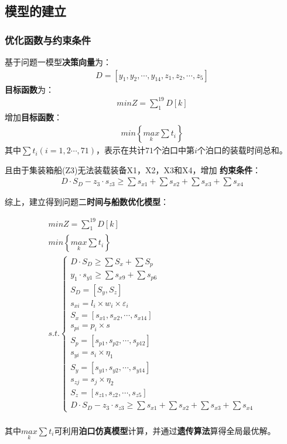 \documentclass{whutmod}
\begin{document}
	\subsection{模型的建立}
	    \subsubsection{优化函数与约束条件}
	基于问题一模型\textbf{决策向量}为：
	\begin{gather*}
	D=[y_{1},y_{2},\cdots,y_{14},z_{1},z_{2},\cdots,z_{5}]
	\end{gather*}
	\textbf{目标函数}为：
	\begin{gather}
	min Z=\sum _{1}^{19}D[k]
	\end{gather}
	增加\textbf{目标函数}：
		\begin{gather}
	min \left \{ \underset{k}{max}\sum t_{i} \right \}
	\end{gather}
	其中$\sum t_{i}(i=1,2\cdots,71)$，表示在共计$71$个泊口中第$i$个泊口的装载时间总和。	
	

	且由于集装箱船(Z3)无法装载装备X1，X2，X3和X4，增加	\textbf{约束条件}：
	\begin{gather}
	D \cdot S_{D} - z_{3} \cdot s_{z3} \geq  \sum s_{x1}+ \sum s_{x2}+\sum s_{x3}+ \sum s_{x4}
	\end{gather}
	
	
		综上，建立得到问题二\textbf{时间与船数优化模型}：

	\begin{gather}
min Z=\sum _{1}^{19}D[k]\\
min \left \{ \underset{k}{max}\sum t_{i} \right \}\\
s.t.\left\{\begin{matrix}	 D\cdot S_{D}\geq \sum  S_{x} + \sum  S_{p}
\\ y_{1}\cdot s_{y1}\geq \sum s_{x9}+ \sum  s_{p6}
\\S_{D}=[S_{y}, S_{z}]
\\ s_{xi}=l_{i}\times w_{i} \times \varepsilon _{i}
\\S_{x}=[s_{x1},s_{x2},\cdots,s_{x14}]
\\s_{pi}=p_{i}\times s
\\S_{p}=[s_{p1},s_{p2},\cdots,s_{p12}]
\\     s_{yi}=s_{i}\times \eta_{1}
\\   S_{y}=[s_{y1},s_{y2},\cdots,s_{y14}]
\\      s_{zj}=s_{j}\times \eta_{2}
\\ S_{z}=[s_{z1},s_{z2},\cdots,s_{z5}]
\\	D \cdot S_{D} - z_{3} \cdot s_{z3} \geq  \sum s_{x1}+ \sum s_{x2}+\sum s_{x3}+ \sum s_{x4}
\end{matrix}\right. 
\end{gather}
	     ~\\
	其中$ \underset{k}{max}\sum t_{i} $可利用\textbf{泊口仿真模型}计算，并通过\textbf{遗传算法}算得全局最优解。
\end{document}
